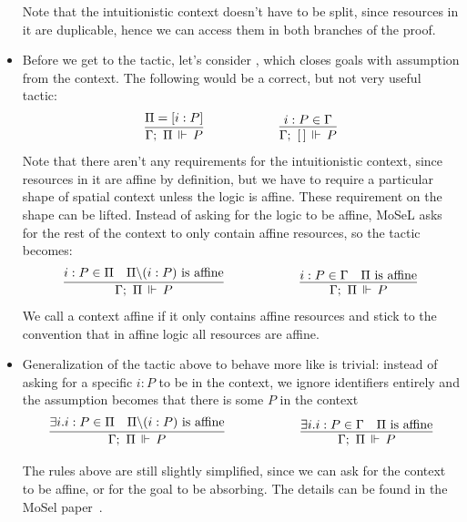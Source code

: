\begin{itemize}
   Note that the intuitionistic context doesn't have to be split, since resources in it are duplicable, hence we can access them in both branches of the proof.
\item Before we get to the  tactic, let's consider , which closes goals with assumption  from the context.
  The following would be a correct, but not very useful tactic:
  \begin{align*}
      \infer
        {\entailsD P}
        {\SpatD = [i : P]}
    & \hspace{5em}
    & \infer
        {\entails {\IntuD} {[\,]} P}
        {i : P \in \IntuD}
  \end{align*}
  Note that there aren't any requirements for the intuitionistic context, since resources in it are affine by definition, but we have to require a particular shape of spatial context unless the logic is affine.
  These requirement on the shape can be lifted.
  Instead of asking for the logic to be affine, MoSeL asks for the rest of the context to only contain affine resources, so the tactic becomes:
  \begin{align*}
      \infer%
        {\entailsD P}
        {i : P \in \SpatD &
         \SpatD \backslash (i : P) \text{ is affine}}
    & \hspace{5em}
    & \infer%
        {\entailsD P}
        {i : P \in \IntuD &
         \SpatD \text{ is affine}}
  \end{align*}
  We call a context affine if it only contains affine resources and stick to the convention that in affine logic all resources are affine.
\item Generalization of the tactic above to behave more like  is trivial: instead of asking for a specific \(i : P\) to be in the context, we ignore identifiers entirely and the assumption becomes that there is some \(P\) in the context
  \begin{align*}
      \infer%
        {\entailsD P}
        {\exists i. i : P \in \SpatD &
         \SpatD \backslash (i : P) \text{ is affine}}
    & \hspace{5em}
    & \infer%
        {\entailsD P}
        {\exists i. i : P \in \IntuD &
         \SpatD \text{ is affine}}
  \end{align*}

  The rules above are still slightly simplified, since we can ask for the context to be affine, or for the goal to be absorbing.
  The details can be found in the MoSel paper~\cite[Section 2.3]{krebbersMoSeLGeneralExtensible2018}.
\end{itemize}

